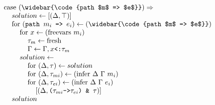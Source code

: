 \documentclass[acmsmall]{acmart}
\begin{document}
\begin{figure*}[h]
\[\begin{array}[t]{@{} l}
    \\
    \I \text{case } (\widebar{\code{path $m$ => $e$}})  \Rightarrow  
    \\
    \I\I solution \leftarrow [(\Delta, \top)]
    \\
    \I\I \text{for } (\code{path $m_i$ => $e_i$}) \leftarrow (\widebar{\code{path $m$ => $e$}}) 
    \\
    \I\I\I \text{for } x \leftarrow (\text{freevars } m_i)
    \\
    \I\I\I\I \tau_m \leftarrow \text{fresh} 
    \\
    \I\I\I\I \Gamma \leftarrow \Gamma, \code{$x$<:$\tau_m$}
    \\
    \I\I\I solution \leftarrow
    \\
    \I\I\I\I \text{for } (\Delta, \tau) \leftarrow solution 
    \\
    \I\I\I\I \text{for } (\Delta, \tau_{mi}) \leftarrow (\text{infer } \Delta\ \Gamma\ m_i) 
    \\
    \I\I\I\I \text{for } (\Delta, \tau_{ei}) \leftarrow (\text{infer } \Delta\ \Gamma\ e_i) 
    \\
    \I\I\I\I\I [(\Delta, \code{($\tau_{mi}$->$\tau_{ei}$) \& $\tau$})]
    \\
    \I\I solution


\end{array}\]
\end{figure*}
\end{document}
